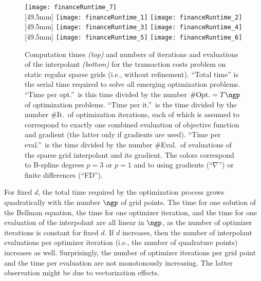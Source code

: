 \begin{figure}
  \texttt{[image: financeRuntime\_7]}%
  \\[1mm]%
  [49.5mm]{%
    \texttt{[image: financeRuntime\_1]}%
    \vspace*{0.3mm}\newline\hspace*{1.0mm}%
    \texttt{[image: financeRuntime\_2]}%
  }%
  \hfill%
  [49.5mm]{%
    \texttt{[image: financeRuntime\_3]}%
    \vspace*{0.3mm}\newline\hspace*{1.0mm}%
    \texttt{[image: financeRuntime\_4]}%
  }%
  \hfill%
  [49.5mm]{%
    \texttt{[image: financeRuntime\_5]}%
    \vspace*{0.3mm}\newline\hspace*{1.0mm}%
    \texttt{[image: financeRuntime\_6]}%
  }%
  \caption[Computation times and numbers of iterations for the TCP]{%
    Computation times \emph{(top)} and
    numbers of iterations and evaluations of the interpolant \emph{(bottom)}
    for the transaction costs problem on static regular sparse grids
    (i.e., without refinement).
    ``Total time'' is the serial time required to solve all
    emerging optimization problems.
    ``Time per opt.''\ is this time divided by the number
    $\mathrm{\#Opt.} = T\ngp$ of optimization problems.
    ``Time per it.''\ is the time divided by the number
    \#It.\ of optimization iterations,
    each of which is assumed to correspond to
    exactly one combined evaluation of objective function and gradient
    (the latter only if gradients are used).
    ``Time per eval.''\ is the time divided by
    the number \#Eval.\ of evaluations of
    the sparse grid interpolant and its gradient.
    The colors correspond to B-spline degrees $p = 3$ or $p = 1$ and
    to using gradients (``$\nabla$'') or finite differences (``FD'').%
  }%
  \label{fig:financeRuntime}%
\end{figure}%
For fixed $d$, the total time required by the optimization process
grows quadratically with the number $\ngp$ of grid points.
The time for one solution of the Bellman equation,
the time for one optimizer iteration, and
the time for one evaluation of the interpolant are all linear in $\ngp$,
as the number of optimizer iterations
is constant for fixed $d$.
If $d$ increases,
then the number of interpolant evaluations per optimizer iteration
(i.e., the number of quadrature points) increases as well.
Surprisingly, the number of optimizer iterations per grid point
and the time per evaluation are not monotonously increasing.
The latter observation might be due to vectorization effects.

